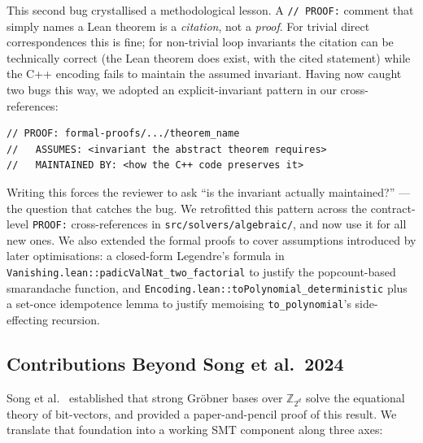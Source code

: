 \documentclass[runningheads]{llncs}
\begin{document}
This second bug crystallised a methodological lesson. A
\texttt{// PROOF:} comment that simply names a Lean theorem is a
\emph{citation}, not a \emph{proof}. For trivial direct
correspondences this is fine; for non-trivial loop invariants
the citation can be technically correct (the Lean theorem does
exist, with the cited statement) while the C++ encoding fails
to maintain the assumed invariant. Having now caught two bugs
this way, we adopted an explicit-invariant pattern in our
cross-references:
\begin{verbatim}
// PROOF: formal-proofs/.../theorem_name
//   ASSUMES: <invariant the abstract theorem requires>
//   MAINTAINED BY: <how the C++ code preserves it>
\end{verbatim}
Writing this forces the reviewer to ask ``is the invariant
actually maintained?'' --- the question that catches the bug.
We retrofitted this pattern across the contract-level
\texttt{PROOF:} cross-references in
\texttt{src/solvers/algebraic/}, and now use it for all new
ones. We also extended the formal proofs to cover assumptions
introduced by later optimisations: a closed-form Legendre's
formula in \texttt{Vanishing.lean::padicValNat\_two\_factorial}
to justify the popcount-based smarandache function, and
\texttt{Encoding.lean::toPolynomial\_deterministic} plus a
set-once idempotence lemma to justify memoising
\texttt{to\_polynomial}'s side-effecting recursion.

\subsection{Contributions Beyond Song et al.\ 2024}
\label{sec:algebraic-contrib}

Song et al.~\cite{song2024equational} established that strong
Gr\"obner bases over $\mathbb{Z}_{2^d}$ solve the equational theory
of bit-vectors, and provided a paper-and-pencil proof of this
result. We translate that foundation into a working SMT
component along three axes:
\end{document}
